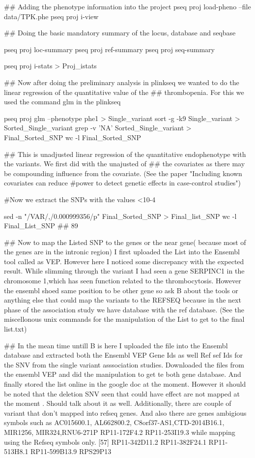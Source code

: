 ## Adding the phenotype information into the project
pseq proj load-pheno --file data/TPK.phe 
pseq proj i-view

## Doing the basic mandatory summary of the locus, database and seqbase

pseq proj loc-summary
pseq proj ref-summary 
pseq proj seq-summary

 pseq proj i-stats > Proj_istats
 
 ## Now after doing the preliminary analysis in plinkseq we wanted to do the linear regression of the quantitative value of the ## thrombopenia. For this we used the command glm in the plinkseq
 
 pseq proj glm --phenotype phe1 > Single_variant
 sort -g -k9 Single_variant > Sorted_Single_variant
 grep -v 'NA' Sorted_Single_variant > Final_Sorted_SNP
 wc -l Final_Sorted_SNP

## This is unadjusted linear regression of the quantitative endophenotype with the variants. We first did with the unajusted of ## the covariates as there may be compounding influence from the covariate. (See the paper "Including known covariates can  reduce #power to detect genetic effects in case-control studies")

#Now we extract the SNPs with the values <10-4

 sed -n "/VAR/,/0.000999356/p" Final_Sorted_SNP > Final_list_SNP
 wc -l Final_List_SNP  ## 89
 
 ## Now to map the Listed SNP to the genes or the near gene( because most of the genes are in the intronic region) I first uploaded the List into the Ensembl tool called as VEP. However here I noticed some discrepancy with the expected result. While slimming through the variant I had seen a gene SERPINC1 in the chromosome 1,which has seen function related to the thrombocytosis. However the ensembl shoed same position to be other gene so ask B about the tools or anything else that could map the variants to the REFSEQ because in the next phase of the association study we have database with the ref database. (See the miscellonous unix commands for the manipulation of the List to get to the final list.txt)

## In the mean time untill B is here I uploaded the file into the Ensembl database and extracted both the Ensembl VEP Gene Ids as well Ref sef Ids for the SNV from the single variant asssociation studies. Downloaded the files from the ensembl VEP and did the manipulation to get te both gene database. And finally stored the list online in the google doc at the moment. However it should be noted that the deletion SNV seen that could have effect are not mapped at the moment . Should talk about it as well. Additionally, there are couple of variant that don't mapped into refseq genes. 
And also there are genes ambigious symbols such as  AC015600.1, AL662800.2, C8orf37-AS1,CTD-2014B16.1, MIR1256, MIR324,RNU6-271P     RP11-172F4.2  RP11-253I19.3 while mapping using the Refseq symbols only. 
[57] RP11-342D11.2 RP11-382F24.1 RP11-513H8.1  RP11-599B13.9 RPS29P13

 
